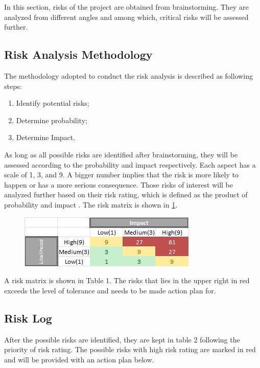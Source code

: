 

In this section, risks of the project are obtained from brainstorming. They are analyzed from different angles and among which, critical risks will be assessed further.   
\subsection{Risk Analysis Methodology}
The methodology adopted to conduct the risk analysis is described as following steps:  
\begin{enumerate}[itemsep=0pt, topsep=3pt, partopsep=3pt, label=\Roman*]
  \item Identify potential risks;
  \item Determine probability;
  \item Determine Impact.
\end{enumerate}

As long as all possible risks are identified after brainstorming, they will be assessed according to the probability and impact respectively. Each aspect has a scale of 1, 3, and 9. A bigger number implies that the risk is more likely to happen or has a more serious consequence. Those risks of interest will be analyzed further based on their risk rating, which is defined as the product of probability and impact \cite{Risk}. The risk matrix is shown in \ref{fig:riskmatrix}.  


\begin{figure}[h!]
\centering
\includegraphics[scale=1.0]{Pictures/riskmatrix.png}
\label{fig:riskmatrix}
\end{figure}

A risk matrix is shown in Table 1. The risks that lies in the upper right in red exceeds the level of tolerance and needs to be made action plan for. 
\subsection{Risk Log}
After the possible risks are identified, they are kept in table 2 following the priority of risk rating. The possible risks with high risk rating are marked in red and will be provided with an action plan below. 

